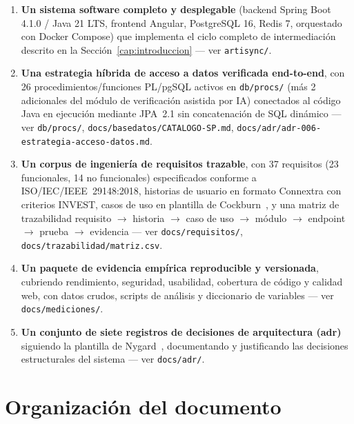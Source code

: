\begin{enumerate}
  \item \textbf{Un sistema software completo y desplegable} (backend
    Spring Boot 4.1.0 / Java 21 LTS, frontend Angular, PostgreSQL 16,
    Redis 7, orquestado con Docker Compose) que implementa el ciclo
    completo de intermediación descrito en la Sección~\ref{cap:introduccion}
    --- ver \texttt{artisync/}.
  \item \textbf{Una estrategia híbrida de acceso a datos verificada
    end-to-end}, con 26 procedimientos/funciones PL/pgSQL activos en
    \texttt{db/procs/} (más 2 adicionales del módulo de verificación
    asistida por IA) conectados al código Java en ejecución mediante
    JPA~2.1 sin concatenación de SQL dinámico --- ver \texttt{db/procs/},
    \texttt{docs/basedatos/CATALOGO-SP.md},
    \texttt{docs/adr/adr-006-estrategia-acceso-datos.md}.
  \item \textbf{Un corpus de ingeniería de requisitos trazable}, con 37
    requisitos (23 funcionales, 14 no funcionales) especificados conforme
    a ISO/IEC/IEEE~29148:2018, historias de usuario en formato Connextra
    con criterios INVEST, casos de uso en plantilla de
    Cockburn~\cite{COCKBURN2000}, y una matriz de trazabilidad requisito
    $\to$ historia $\to$ caso de uso $\to$ módulo $\to$ endpoint $\to$
    prueba $\to$ evidencia --- ver \texttt{docs/requisitos/},
    \texttt{docs/trazabilidad/matriz.csv}.
  \item \textbf{Un paquete de evidencia empírica reproducible y
    versionada}, cubriendo rendimiento, seguridad, usabilidad, cobertura
    de código y calidad web, con datos crudos, scripts de análisis y
    diccionario de variables --- ver \texttt{docs/mediciones/}.
  \item \textbf{Un conjunto de siete registros de decisiones de
    arquitectura (\gls{adr})} siguiendo la plantilla de
    Nygard~\cite{NYGARD2011}, documentando y justificando las decisiones
    estructurales del sistema --- ver \texttt{docs/adr/}.
\end{enumerate}

\section{Organización del documento}

